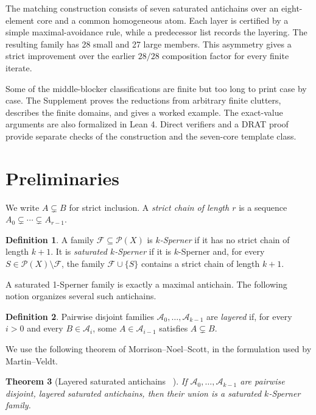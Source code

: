 \documentclass[a4paper,fleqn,longmktitle]{cas-sc}
\newtheorem{theorem}{Theorem}[section]
\theoremstyle{definition}
\newtheorem{definition}[theorem]{Definition}
\theoremstyle{remark}
\newcommand{\powerset}{\mathcal{P}}
\newcommand{\family}{\mathcal{F}}
\begin{document}
The matching construction consists of seven saturated antichains over an
eight-element core and a common homogeneous atom.  Each layer is certified by
a simple maximal-avoidance rule, while a predecessor list records the
layering.  The resulting family has 28 small and 27 large members.  This
asymmetry gives a strict improvement over the earlier $28/28$ composition
factor for every finite iterate.

Some of the middle-blocker classifications are finite but too long to print
case by case.  The Supplement proves the reductions from arbitrary finite
clutters, describes the finite domains, and gives a worked example.  The
exact-value arguments are also formalized in Lean 4.  Direct verifiers and a
DRAT proof provide separate checks of the construction and the seven-core
template class.

\section{Preliminaries}
\label{sec:preliminaries}

We write $A\subsetneq B$ for strict inclusion.  A \emph{strict chain of
length $r$} is a sequence $A_0\subsetneq\cdots\subsetneq A_{r-1}$.

\begin{definition}
A family $\family\subseteq\powerset(X)$ is \emph{$k$-Sperner} if it has no
strict chain of length $k+1$.  It is \emph{saturated $k$-Sperner} if it is
$k$-Sperner and, for every $S\in\powerset(X)\setminus\family$, the family
$\family\cup\{S\}$ contains a strict chain of length $k+1$.
\end{definition}

A saturated 1-Sperner family is exactly a maximal antichain.  The following
notion organizes several such antichains.

\begin{definition}
Pairwise disjoint families $\mathcal A_0,\ldots,\mathcal A_{k-1}$ are
\emph{layered} if, for every $i>0$ and every $B\in\mathcal A_i$, some
$A\in\mathcal A_{i-1}$ satisfies $A\subsetneq B$.
\end{definition}

We use the following theorem of Morrison--Noel--Scott, in the formulation used
by Martin--Veldt.

\begin{theorem}[Layered saturated antichains~
  \cite{mns2014,martinveldt2025}]
\label{thm:layered}
If $\mathcal A_0,\ldots,\mathcal A_{k-1}$ are pairwise disjoint, layered
saturated antichains, then their union is a saturated $k$-Sperner family.
\end{theorem}
\end{document}
